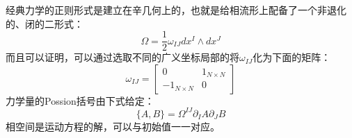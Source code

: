 经典力学的正则形式是建立在辛几何上的，也就是给相流形上配备了一个非退化的、闭的二形式\cite{Arnold}：
\begin{equation}\label{eq:23.22}
	\Omega=\frac{1}{2}\omega_{IJ}dx^I\wedge dx^J
\end{equation}
而且可以证明，可以通过选取不同的广义坐标局部的将$\omega_{IJ}$化为下面的矩阵：
\begin{equation}
	\omega_{IJ}=\left.\left[\begin{matrix}0&1_{N\times N}\\-1_{N\times N}&0\end{matrix}\right.\right]
\end{equation}
力学量的Possion括号由下式给定：
\begin{equation}
	\{A,B\}=\Omega^{IJ}\partial_IA\partial_JB
\end{equation}
相空间是运动方程的解，可以与初始值一一对应。

